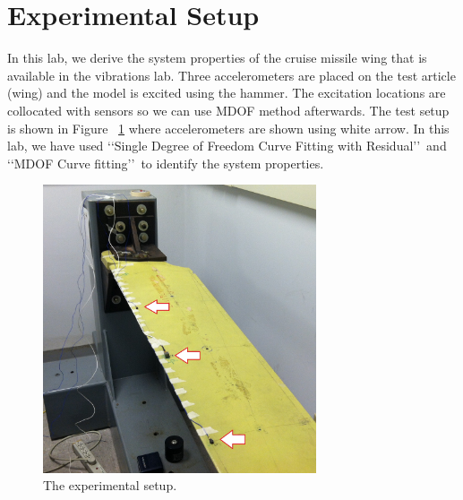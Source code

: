 \documentclass[paper=a4, fontsize=12pt]{scrartcl} %
\begin{document}
\section*{Experimental Setup}
In this lab, we derive the system properties of the cruise missile wing that is available in the vibrations lab. Three accelerometers are placed on the test article (wing) and the model is excited using the hammer. The excitation locations are collocated with sensors so we can use MDOF method afterwards. The test setup is shown in Figure ~\ref{fig:test_setup} where accelerometers are shown using white arrow. In this lab, we have used \lq\lq Single Degree of Freedom Curve Fitting with Residual\rq\rq\ and \lq\lq MDOF Curve fitting\rq\rq\ to identify the system properties.
%
\begin{figure}[H]
	\centering
	\includegraphics[height = 8.5cm]{test_setup.jpg}
	\caption{The experimental setup.}
	\label{fig:test_setup}
\end{figure}
%
\end{document}
